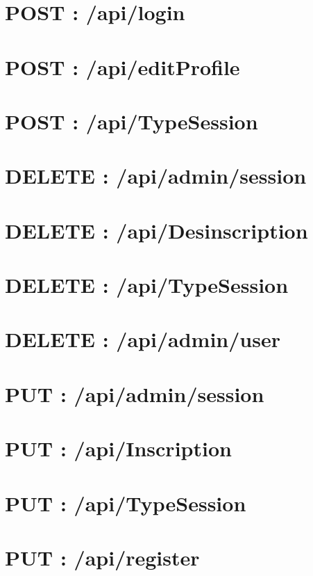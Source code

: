	
\vspace{\baselineskip}
\section{POST : /api/login}
	
	
	
\vspace{\baselineskip}
\section{POST : /api/editProfile}
	
	
	
\vspace{\baselineskip}
\section{POST : /api/TypeSession}
	


\newpage
\section{DELETE : /api/admin/session}
	
	
\newpage
\section{DELETE : /api/Desinscription}
	

\newpage
\section{DELETE : /api/TypeSession}
	
	
\newpage
\section{DELETE : /api/admin/user}
	
	
	
\newpage
\section{PUT : /api/admin/session}
	
	
	
\vspace{\baselineskip}
\section{PUT : /api/Inscription}
	
	
	
\vspace{\baselineskip}
\section{PUT : /api/TypeSession}
	
	
\newpage
\section{PUT : /api/register}
	
